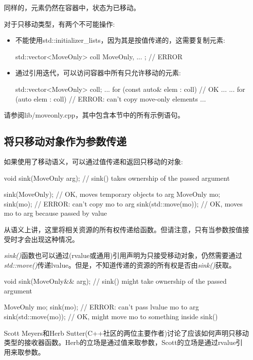 同样的，元素仍然在容器中，状态为已移动。

对于只移动类型，有两个不可能操作:

\begin{itemize}
\item 不能使用std::initializer_lists，因为其是按值传递的，这需要复制元素:
\begin{cppcode}
std::vector<MoveOnly> coll{ MoveOnly{}, ... }; // ERROR
\end{cppcode}
\item 通过引用迭代，可以访问容器中所有只允许移动的元素:
\begin{cppcode}
std::vector<MoveOnly> coll;
...
for (const auto& elem : coll) { // OK
	...
}
...
for (auto elem : coll) { // ERROR: can’t copy move-only elements
	...
}
\end{cppcode}
\end{itemize}

请参阅lib/moveonly.cpp，其中包含本节中的所有示例语句。

\subsection{将只移动对象作为参数传递}

如果使用了移动语义，可以通过值传递和返回只移动的对象:

\begin{cppcode}
void sink(MoveOnly arg); // sink() takes ownership of the passed argument

sink(MoveOnly{}); // OK, moves temporary objects to arg
MoveOnly mo;
sink(mo); // ERROR: can’t copy mo to arg
sink(std::move(mo)); // OK, moves mo to arg because passed by value
\end{cppcode}

从语义上讲，这里将相关资源的所有权传递给函数。但请注意，只有当参数按值接受时才会出现这种情况。

\textit{sink()}函数也可以通过(rvalue或通用)引用声明为只接受移动对象，仍然需要通过\textit{std::move()}传递lvalue。但是，不知道传递的资源的所有权是否由\textit{sink()}获取。

\begin{cppcode}
void sink(MoveOnly&& arg); // sink() might take ownership of the passed argument

MoveOnly mo;
sink(mo); // ERROR: can’t pass lvalue mo to arg
sink(std::move(mo)); // OK, might move mo to something inside sink()
\end{cppcode}

Scott Meyers和Herb Sutter(C++社区的两位主要作者)讨论了应该如何声明只移动类型的接收器函数。Herb的立场是通过值来取参数，Scott的立场是通过rvalue引用来取参数。

